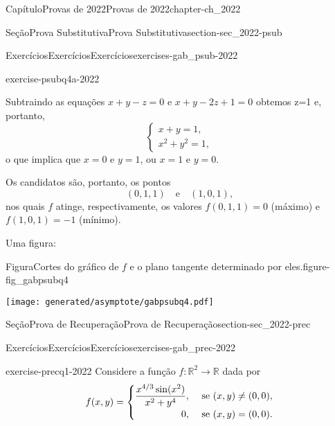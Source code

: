 \documentclass[oneside,10pt,]{book}
\numberwithin{equation}{section}
\newcommand{\R}{\mathbb R}
\begin{document}
\begin{chapterptx}{Capítulo}{Provas de 2022}{}{Provas de 2022}{}{}{chapter-ch_2022}
\begin{sectionptx}{Seção}{Prova Substitutiva}{}{Prova Substitutiva}{}{}{section-sec_2022-psub}
\begin{exercises-subsection-numberless}{Exercícios}{Exercícios}{}{Exercícios}{}{}{exercises-gab_psub-2022}
\begin{divisionexercise}{4}{}{}{exercise-psubq4a-2022}
\begin{equation*}
\end{equation*}
%
\par
Subtraindo as equações \(x+ y -z =0\) e \(x+y-2z+1=0\) obtemos \textdollar{}z=1\textdollar{} e, portanto,%
\begin{equation*}
\begin{cases} x+y=1,\\ x^2 +
y^2=1, \end{cases}
\end{equation*}
o que implica que \(x=0\) e \(y=1\), ou \(x=1\) e \(y=0\).%
\par
Os candidatos são, portanto, os pontos%
\begin{equation*}
(0,1,1) \quad
\text{e} \quad (1,0,1),
\end{equation*}
nos quais \(f\) atinge, respectivamente, os valores \(f(0,1,1)=0\) (máximo) e \(f(1,0,1)=-1\) (mínimo).%
\par
Uma figura:%
\begin{figureptx}{Figura}{Cortes do gráfico de \(f\) e o plano tangente determinado por eles.}{figure-fig_gabpsubq4}{}%
\begin{image}{0}{1}{0}{}%
\texttt{[image: generated/asymptote/gabpsubq4.pdf]}
\end{image}%
\tcblower
\end{figureptx}%
\end{divisionexercise}%
\end{exercises-subsection-numberless}
\end{sectionptx}
%
%
\typeout{************************************************}
\typeout{************************************************}
%
\begin{sectionptx}{Seção}{Prova de Recuperação}{}{Prova de Recuperação}{}{}{section-sec_2022-prec}
%
%
\typeout{************************************************}
\typeout{************************************************}
%
\begin{exercises-subsection-numberless}{Exercícios}{Exercícios}{}{Exercícios}{}{}{exercises-gab_prec-2022}
\begin{divisionexercise}{1}{}{}{exercise-precq1-2022}%
Considere a função \(f\colon\R^2\to\R\) dada por%
\begin{equation*}
f(x,y)=
\begin{cases}
\dfrac{x^{4/3}\sin(x^2)}{x^2+y^4},&\text{ se } (x,y) \neq (0,0),\\
\hfill 0,&\text{ se } (x,y)=(0,0).
\end{cases}

\end{equation*}
\end{divisionexercise}
\end{exercises-subsection-numberless}
\end{sectionptx}
\end{chapterptx}
\end{document}
